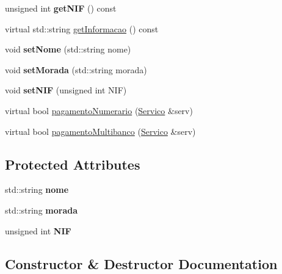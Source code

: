 \begin{DoxyCompactItemize}
unsigned int {\bfseries get\+N\+IF} () const
\item 
virtual std\+::string \hyperlink{class_cliente_a932ef71b2792dc5df153f82d3e81a6f3}{get\+Informacao} () const
\item 
\mbox{\label{class_cliente_a6f69591975dd6db60d61da4744a61d95}} 
void {\bfseries set\+Nome} (std\+::string nome)
\item 
\mbox{\label{class_cliente_ac153d8134504564bb599d47611cd7726}} 
void {\bfseries set\+Morada} (std\+::string morada)
\item 
\mbox{\label{class_cliente_a203e0f379622d73f1f58f2d650233a8d}} 
void {\bfseries set\+N\+IF} (unsigned int N\+IF)
\item 
virtual bool \hyperlink{class_cliente_a68646846a80de5cdcb61b1f8a13e4fb8}{pagamento\+Numerario} (\hyperlink{class_servico}{Servico} \&serv)
\item 
virtual bool \hyperlink{class_cliente_a6e230e5e512bebe07bfa1ad6750b8cee}{pagamento\+Multibanco} (\hyperlink{class_servico}{Servico} \&serv)
\end{DoxyCompactItemize}
\subsection*{Protected Attributes}
\begin{DoxyCompactItemize}
\item 
\mbox{\label{class_cliente_aaa79b0a26f7d5d007fe4ae9696564ca5}} 
std\+::string {\bfseries nome}
\item 
\mbox{\label{class_cliente_a24ba6895be9bdf5112e9e67a34d13704}} 
std\+::string {\bfseries morada}
\item 
\mbox{\label{class_cliente_a7a012a7819f17eb18a9580fe32723aeb}} 
unsigned int {\bfseries N\+IF}
\end{DoxyCompactItemize}


\subsection{Constructor \& Destructor Documentation}
\mbox{\label{class_cliente_a5957c05b3d3594a7cbd8c088486d14ae}} 
